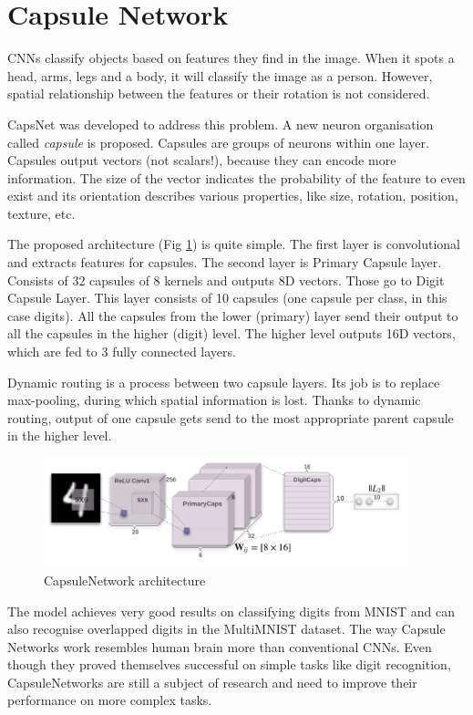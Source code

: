 \section{Capsule Network}
CNNs classify objects based on features they find in the image. When it spots a head, arms, legs and a body, it will classify the image as a person. However, spatial relationship between the features or their rotation is not considered. 

CapsNet \cite{capsnet2017} was developed to address this problem. A new neuron organisation called \textit{capsule} is proposed. Capsules are groups of neurons within one layer. Capsules output vectors (not scalars!), because they can encode more information. The size of the vector indicates the probability of the feature to even exist and its orientation describes various properties, like size, rotation, position, texture, etc. 

The proposed architecture (Fig \ref{fig:capsnet}) is quite simple. The first layer is convolutional and extracts features for capsules. The second layer is Primary Capsule layer. Consists of 32 capsules of 8 kernels and outputs 8D vectors. Those go to Digit Capsule Layer. This layer consists of 10 capsules (one capsule per class, in this case digits). All the capsules from the lower (primary) layer send their output to all the capsules in the higher (digit) level. The higher level outputs 16D vectors, which are fed to 3 fully connected layers. 

Dynamic routing is a process between two capsule layers. Its job is to replace max-pooling, during which spatial information is lost. Thanks to dynamic routing, output of one capsule gets send to the most appropriate parent capsule in the higher level. 

\begin{figure}[ht!]
    \centering
    \includegraphics[width=300pt]{images/capsnet.png}
    \caption[CapsuleNetwork architecture]{CapsuleNetwork architecture \cite{capsnet2017}}
    \label{fig:capsnet}
\end{figure}

The model achieves very good results on classifying digits from MNIST and can also recognise overlapped digits in the MultiMNIST dataset. The way Capsule Networks work resembles human brain more than conventional CNNs. Even though they proved themselves successful on simple tasks like digit recognition, CapsuleNetworks are still a subject of research and need to improve their performance on more complex tasks. 